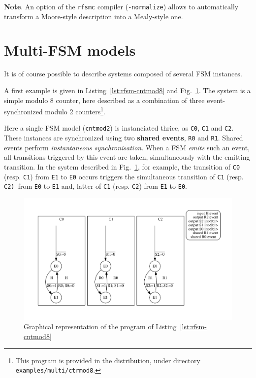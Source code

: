 \medskip \textbf{Note}. An option of the \texttt{rfsmc} compiler (\verb|-normalize|) allows to
automatically transform a Moore-style description into a Mealy-style one.


\section*{Multi-FSM models}
\label{sec:multi-fsm-models}

It is of course possible to describe systems composed of several FSM instances.

\medskip
A first example is given in Listing~\ref{lst:rfsm-cntmod8} and Fig.~\ref{fig:rfsm-cntmod8}. The system is a simple modulo 8 counter, here
described as a combination of three event-synchronized modulo 2 counters\footnote{This program is
  provided in the distribution, under directory \texttt{examples/multi/ctrmod8}.}.

Here a single FSM model (\texttt{cntmod2}) is instanciated thrice, as \texttt{C0}, \texttt{C1} and
\texttt{C2}. These instances are synchronized using two \textbf{shared events}, \texttt{R0} and \texttt{R1}. 
Shared events perform \emph{instantaneous synchronisation}. When a FSM \emph{emits} such an event, all transitions
triggered by this event are taken, simultaneously with the emitting transition. In the system
described in Fig.~\ref{fig:rfsm-cntmod8}, for example, the transition of \texttt{C0}
(resp. \texttt{C1}) from \texttt{E1} to \texttt{E0} occurs triggers the simultaneous transition of
\texttt{C1} (resp. \texttt{C2) }from \texttt{E0} to \texttt{E1} and, latter of \texttt{C1}
(resp. \texttt{C2}) from \texttt{E1} to \texttt{E0}.

\begin{figure}
  \centering
\includegraphics[width=\textwidth]{figs/ctrmod8-top}
  \caption{Graphical representation of the program of Listing~\ref{lst:rfsm-cntmod8}}
  \label{fig:rfsm-cntmod8}
\end{figure}

